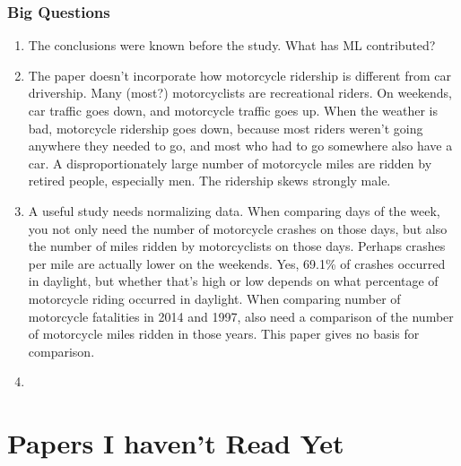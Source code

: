 \documentclass[11pt]{article}
\begin{document}
\begin{spacing}{1.2}
\subsubsection{Big Questions}
\begin{enumerate}
	\item The conclusions were known before the study.  What has ML contributed?
	\item The paper doesn't incorporate how motorcycle ridership is different from car drivership.  Many (most?) motorcyclists are recreational riders.  On weekends, car traffic goes down, and motorcycle traffic goes up.  When the weather is bad, motorcycle ridership goes down, because most riders weren't going anywhere they needed to go, and most who had to go somewhere also have a car.   A disproportionately large number of motorcycle miles are ridden by retired people, especially men.  The ridership skews strongly male.  
	\item A useful study needs normalizing data.  When comparing days of the week, you not only need the number of motorcycle crashes on those days, but also the number of miles ridden by motorcyclists on those days.  Perhaps crashes per mile are actually lower on the weekends.  Yes, 69.1\% of crashes occurred in daylight, but whether that's high or low depends on what percentage of motorcycle riding occurred in daylight.  When comparing number of motorcycle fatalities in 2014 and 1997, also need a comparison of the number of motorcycle miles ridden in those years.  This paper gives no basis for comparison. 
	\item 
\end{enumerate}

\section{Papers I haven't Read Yet}

\cite{doi:10.1080/12265934.2018.1431146}







\clearpage
{}
\printindex

\end{spacing}
\end{document}
